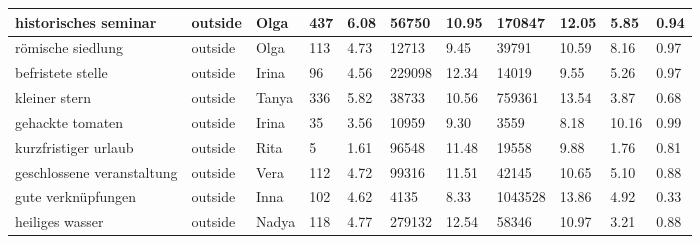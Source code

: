 \begin{longtable}{|p{3cm}|p{1cm}|p{1cm}|R{0.8cm}|R{0.8cm}|R{1.2cm}|R{1cm}|R{1.3cm}|R{1cm}|R{0.8cm}|R{0.6cm}|}
historisches seminar                                               & outside     & Olga      & 437                 & 6.08                      & 56750      & 10.95            & 170847       & 12.05                 & 5.85  & 0.94                 \\ \hline
r\"{o}mische siedlung                                              & outside     & Olga      & 113                 & 4.73                      & 12713      & 9.45             & 39791        & 10.59                 & 8.16  & 0.97                 \\ \hline
befristete stelle                                                  & outside     & Irina     & 96                  & 4.56                      & 229098     & 12.34            & 14019        & 9.55                  & 5.26  & 0.97                 \\ \hline
kleiner stern                                                      & outside     & Tanya     & 336                 & 5.82                      & 38733      & 10.56            & 759361       & 13.54                 & 3.87  & 0.68                 \\ \hline
gehackte tomaten                                                   & outside     & Irina     & 35                  & 3.56                      & 10959      & 9.30             & 3559         & 8.18                  & 10.16 & 0.99                 \\ \hline
kurzfristiger urlaub                                               & outside     & Rita      & 5                   & 1.61                      & 96548      & 11.48            & 19558        & 9.88                  & 1.76  & 0.81                 \\ \hline
geschlossene veranstaltung                                      & outside     & Vera      & 112                 & 4.72                      & 99316      & 11.51            & 42145        & 10.65                 & 5.10  & 0.88                 \\ \hline
gute verkn\"{u}pfungen                                             & outside     & Inna      & 102                 & 4.62                      & 4135       & 8.33             & 1043528      & 13.86                 & 4.92  & 0.33                 \\ \hline
heiliges wasser                                                 & outside     & Nadya     & 118                 & 4.77                      & 279132     & 12.54            & 58346        & 10.97                 & 3.21  & 0.88                 \\ \hline

\end{longtable}
